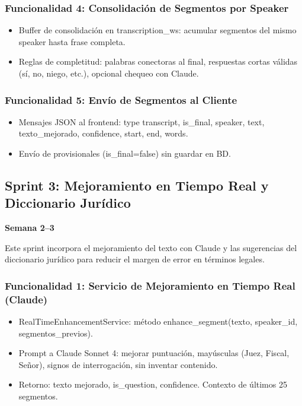 \documentclass[12pt,a4paper]{report}
\begin{document}
\subsubsection{Funcionalidad 4: Consolidación de Segmentos por Speaker}

\begin{itemize}
    \item Buffer de consolidación en transcription\_ws: acumular segmentos del mismo speaker hasta frase completa.
    \item Reglas de completitud: palabras conectoras al final, respuestas cortas válidas (sí, no, niego, etc.), opcional chequeo con Claude.
\end{itemize}

\subsubsection{Funcionalidad 5: Envío de Segmentos al Cliente}

\begin{itemize}
    \item Mensajes JSON al frontend: type transcript, is\_final, speaker, text, texto\_mejorado, confidence, start, end, words.
    \item Envío de provisionales (is\_final=false) sin guardar en BD.
\end{itemize}

\subsection{Sprint 3: Mejoramiento en Tiempo Real y Diccionario Jurídico}

\textbf{Semana 2--3}

Este sprint incorpora el mejoramiento del texto con Claude y las sugerencias del diccionario jurídico para reducir el margen de error en términos legales.

\subsubsection{Funcionalidad 1: Servicio de Mejoramiento en Tiempo Real (Claude)}

\begin{itemize}
    \item RealTimeEnhancementService: método enhance\_segment(texto, speaker\_id, segmentos\_previos).
    \item Prompt a Claude Sonnet 4: mejorar puntuación, mayúsculas (Juez, Fiscal, Señor), signos de interrogación, sin inventar contenido.
    \item Retorno: texto mejorado, is\_question, confidence. Contexto de últimos 25 segmentos.
\end{itemize}
\end{document}
